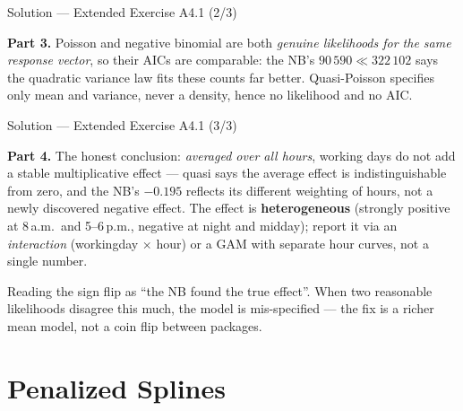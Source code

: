 \documentclass[aspectratio=169,11pt]{beamer}
\begin{document}
\begin{frame}{Solution --- Extended Exercise A4.1 (2/3)}
\begin{solutionbox}
  \textbf{Part 3.} Poisson and negative binomial are both \emph{genuine likelihoods
  for the same response vector}, so their AICs are comparable: the NB's
  $90\,590 \ll 322\,102$ says the quadratic variance law fits these counts far
  better. Quasi-Poisson specifies only mean and variance, never a density, hence
  no likelihood and no AIC.
\end{solutionbox}
\end{frame}

\begin{frame}{Solution --- Extended Exercise A4.1 (3/3)}
\begin{solutionbox}
  \textbf{Part 4.} The honest conclusion: \emph{averaged over all hours}, working days
  do not add a stable multiplicative effect --- quasi says the average effect is
  indistinguishable from zero, and the NB's $-0.195$ reflects its different weighting
  of hours, not a newly discovered negative effect. The effect is
  \textbf{heterogeneous} (strongly positive at 8\,a.m.\ and 5--6\,p.m., negative at
  night and midday); report it via an \emph{interaction} (workingday $\times$ hour) or
  a GAM with separate hour curves, not a single number.
\end{solutionbox}
\begin{mistake}
  Reading the sign flip as ``the NB found the true effect''. When two reasonable
  likelihoods disagree this much, the model is mis-specified --- the fix is a richer
  mean model, not a coin flip between packages.
\end{mistake}
\end{frame}

\section{Penalized Splines}
\end{document}
